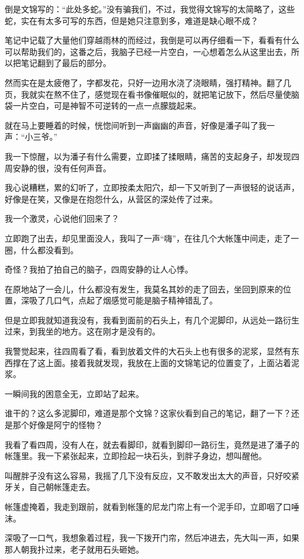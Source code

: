 倒是文锦写的：“此处多蛇。”没有骗我们，不过，我觉得文锦写的太简略了，这些蛇，实在有太多可写的东西，但是她只注意到多，难道是缺心眼不成？

笔记中记载了大量他们穿越雨林的而经过，我倒是可以再仔细看一下，看看有什么可以帮助我们的，这番之后，我脑子已经一片空白，一心想着怎么从这里出去，所以把笔记翻到了最后的部分。

然而实在是太疲倦了，字都发花，只好一边用水浇了浇眼睛，强打精神。翻了几页，我就实在熬不住了，感觉现在看书像催眠似的，就把笔记放下，然后尽量使脑袋一片空白，可是神智不可逆转的一点一点朦胧起来。

就在马上要睡着的时候，恍惚间听到一声幽幽的声音，好像是潘子叫了我一声：“小三爷。”

我一下惊醒，以为潘子有什么需要，立即揉了揉眼睛，痛苦的支起身子，却发现四周安静的很，没有任何声音。

我心说糟糕，累的幻听了，立即按柔太阳穴，却一下又听到了一声很轻的说话声，好像是在笑，又像是在抱怨什么，从营区的深处传了过来。

我一个激灵，心说他们回来了？

立即跑了出去，却见里面没人，我叫了一声“嗨”，在往几个大帐篷中间走，走了一圈，什么都没看到。

奇怪？我拍了拍自己的脑子，四周安静的让人心悸。

在原地站了一会儿，什么都没有发生，我莫名其妙的走了回去，坐回到原来的位置，深吸了几口气，点起了烟感觉可能是脑子精神错乱了。

但是立即我就知道我没有，我看到面前的石头上，有几个泥脚印，从远处一路衍生过来，到我坐的地方。这在刚才是没有的。

我警觉起来，往四周看了看，看到放着文件的大石头上也有很多的泥浆，显然有东西撑在了这上面。接着我就发现，我放在上面的文锦笔记的位置变了，上面沾着泥浆。

一瞬间我的困意全无，立即站了起来。

谁干的？这么多泥脚印，难道是那个文锦？这家伙看到自己的笔记，翻了一下？还是那个好像是阿宁的怪物？

我看了看四周，没有人在，就去看脚印，就看到脚印一路衍生，竟然是进了潘子的帐篷里。我一下紧张起来，立即捡起一块石头，到胖子身边，想叫醒他。

叫醒胖子没有这么容易，我摇了几下没有反应，又不敢发出太大的声音，只好咬紧牙关，自己朝帐篷走去。

帐篷虚掩着，我走到跟前，就看到帐篷的尼龙门帘上有一个泥手印，立即咽了口唾沫。

深吸了一口气，我想象着过程，我一下拨开门帘，然后冲进去，先大叫一声，如果那人朝我扑过来，老子就用石头砸她。

